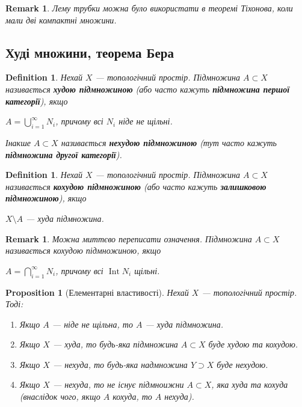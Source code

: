 \documentclass[a4paper, 10pt]{article}
\theoremstyle{theoremdd}
\newtheorem{definition}[theorem]{Definition}
\newtheorem{proposition}[theorem]{Proposition}
\newtheorem{remark}[theorem]{Remark}
\DeclareMathOperator{\Int}{Int}
\begin{document}
\begin{remark}
Лему трубки можна було використати в теоремі Тіхонова, коли мали дві компактні множини.
\end{remark}

\subsection{Худі множини, теорема Бера}
\begin{definition}
Нехай $X$ --- топологічний простір. Підмножина $A \subset X$ називається \textbf{худою підмножиною} (або часто кажуть \textbf{підмножина першої категорії}), якщо
\begin{center}
$A = \displaystyle\bigcup_{i=1}^\infty N_i$, причому всі $N_i$ ніде не щільні.
\end{center}
Інакше $A \subset X$ називається \textbf{нехудою підмножиною} (тут часто кажуть \textbf{підмножина другої категорії}).
\end{definition}

\begin{definition}
Нехай $X$ --- топологічний простір. Підмножина $A \subset X$ називається \textbf{кохудою підмножиною} (або часто кажуть \textbf{залишковою підмножиною}), якщо
\begin{center}
$X \setminus A$ --- худа підмножина.
\end{center}
\end{definition}

\begin{remark}
Можна миттєво переписати означення. Підмножина $A \subset X$ називається кохудою підмножиною, якщо
\begin{center}
$A = \displaystyle\bigcap_{i=1}^\infty N_i$, причому всі $\Int N_i$ щільні.
\end{center}
\end{remark}

\begin{proposition}[Елементарні властивості]
Нехай $X$ --- топологічний простір. Тоді:
\begin{enumerate}[nosep,wide=0pt,label={\arabic*)}]
\item Якщо $A$ --- ніде не щільна, то $A$ --- худа підмножина.
\item Якщо $X$ --- худа, то будь-яка підмножина $A \subset X$ буде худою та кохудою.
\item Якщо $X$ --- нехуда, то будь-яка надмножина $Y \supset X$ буде нехудою.
\item Якщо $X$ --- нехуда, то не існує підмноижни $A \subset X$, яка худа та кохуда (\textit{внаслідок чого, якщо $A$ кохуда, то $A$ нехуда}).
\end{enumerate}
\end{proposition}
\end{document}
